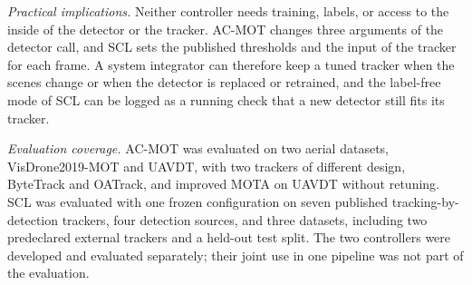 \emph{Practical implications.} Neither controller needs training, labels, or access to the inside of the detector or the tracker. AC-MOT changes three arguments of the detector call, and SCL sets the published thresholds and the input of the tracker for each frame. A system integrator can therefore keep a tuned tracker when the scenes change or when the detector is replaced or retrained, and the label-free mode of SCL can be logged as a running check that a new detector still fits its tracker.

\emph{Evaluation coverage.} AC-MOT was evaluated on two aerial datasets, VisDrone2019-MOT and UAVDT, with two trackers of different design, ByteTrack and OATrack, and improved MOTA on UAVDT without retuning. SCL was evaluated with one frozen configuration on seven published tracking-by-detection trackers, four detection sources, and three datasets, including two predeclared external trackers and a held-out test split. The two controllers were developed and evaluated separately; their joint use in one pipeline was not part of the evaluation.

